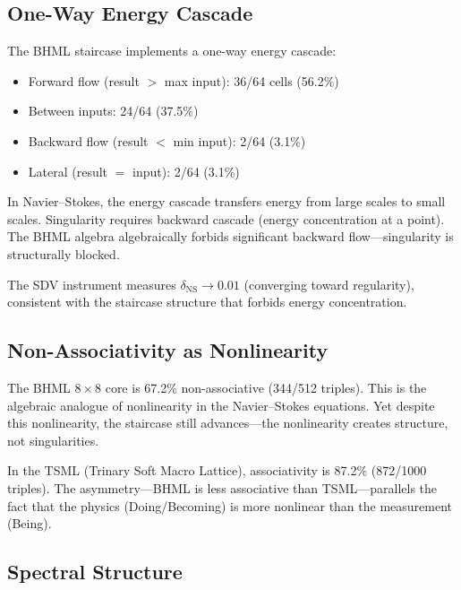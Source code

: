 \documentclass[11pt]{article}
\theoremstyle{definition}
\theoremstyle{remark}
\begin{document}
\subsection{One-Way Energy Cascade}
\label{subsec:energy-cascade}

The BHML staircase implements a one-way energy cascade:

\begin{itemize}[nosep]
  \item Forward flow (result $>$ max input): 36/64 cells (56.2\%)
  \item Between inputs: 24/64 (37.5\%)
  \item Backward flow (result $<$ min input): 2/64 (3.1\%)
  \item Lateral (result $=$ input): 2/64 (3.1\%)
\end{itemize}

In Navier--Stokes, the energy cascade transfers energy from large scales to
small scales.  Singularity requires backward cascade (energy concentration at a
point).  The BHML algebra algebraically forbids significant backward
flow---singularity is structurally blocked.

The SDV instrument measures $\delta_{\mathrm{NS}} \to 0.01$ (converging toward
regularity), consistent with the staircase structure that forbids energy
concentration.

\subsection{Non-Associativity as Nonlinearity}
\label{subsec:non-associativity}

The BHML $8\times 8$ core is 67.2\% non-associative (344/512 triples).  This
is the algebraic analogue of nonlinearity in the Navier--Stokes equations.  Yet
despite this nonlinearity, the staircase still advances---the nonlinearity
creates structure, not singularities.

In the TSML (Trinary Soft Macro Lattice), associativity is 87.2\% (872/1000
triples).  The asymmetry---BHML is less associative than TSML---parallels the
fact that the physics (Doing/Becoming) is more nonlinear than the measurement
(Being).

\subsection{Spectral Structure}
\label{subsec:spectral-structure}
\end{document}
